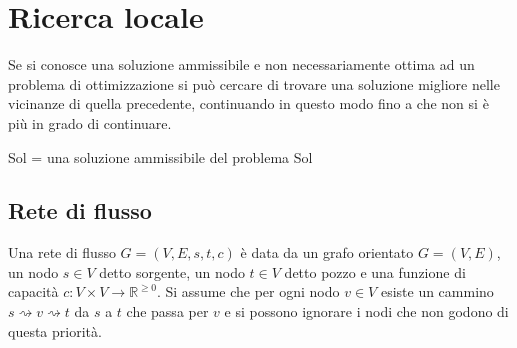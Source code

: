 \chapter{Ricerca locale}
Se si conosce una soluzione ammissibile e non necessariamente ottima ad un problema di ottimizzazione si pu\`o cercare di trovare una soluzione migliore nelle vicinanze di quella
precedente, continuando in questo modo fino a che non si \`e pi\`u in grado di continuare.\\
\begin{algorithm}[H]
\DontPrintSemicolon
{}






\SetKwFunction{}{}
\SetKwFunction{}{}
\SetKwFunction{}{}
\SetKwFunction{}{}
\SetKwFunction{}{}

\caption{\protect\RicercaLocale{}}
Sol = una soluzione ammissibile del problema\;
\Return Sol\;

\end{algorithm}
\section{Rete di flusso}
Una rete di flusso $G=(V, E, s, t, c)$ \`e data da un grafo orientato $G=(V, E)$, un nodo $s\in V$ detto sorgente, un nodo $t\in V$ detto pozzo e una funzione di capacit\`a $c:V\times V
\rightarrow\mathbb{R}^{\ge 0}$. Si assume che per ogni nodo $v\in V$ esiste un cammino $s \rightsquigarrow v \rightsquigarrow t$ da $s$ a $t$ che passa per $v$ e si possono ignorare i 
nodi che non godono di questa priorit\`a.
